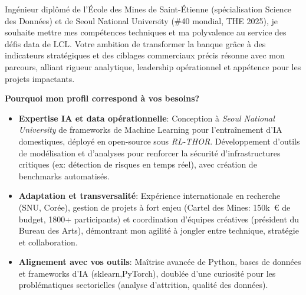 
\newcommand{\Company}{LCL}
\recipient{\RecruitmentTeam{\Company}}{\Company\\Guyancourt\\ France}
\date{21 Mars 2025}
\makelettertitle

Ingénieur diplômé de l'École des Mines de Saint-Étienne (spécialisation Science des Données) et de Seoul National University (\#40 mondial, THE 2025), je souhaite mettre mes compétences techniques et ma polyvalence au service des défis data de LCL\@.
Votre ambition de transformer la banque grâce à des indicateurs stratégiques et des ciblages commerciaux précis résonne avec mon parcours, alliant rigueur analytique, leadership opérationnel et appétence pour les projets impactants.

\textbf{Pourquoi mon profil correspond à vos besoins?}
\begin{itemize}
    \item \textbf{Expertise IA et data opérationnelle}:
          Conception à \textit{Seoul National University} de frameworks de Machine Learning pour l'entraînement d'IA domestiques, déployé en open-source sous \textit{RL-THOR}.
          Développement d'outils de modélisation et d'analyses pour renforcer la sécurité d'infrastructures critiques (ex: détection de risques en temps réel), avec création de benchmarks automatisés.
    \item \textbf{Adaptation et transversalité}: Expérience internationale en recherche (SNU, Corée), gestion de projets à fort enjeu (Cartel des Mines: 150k~€ de budget, 1800+ participants) et coordination d'équipes créatives (président du Bureau des Arts), démontrant mon agilité à jongler entre technique, stratégie et collaboration.
    \item \textbf{Alignement avec vos outils}: Maîtrise avancée de Python, bases de données et frameworks d'IA (sklearn,PyTorch), doublée d'une curiosité pour les problématiques sectorielles (analyse d'attrition, qualité des données).
\end{itemize}
\vspace{7pt}

